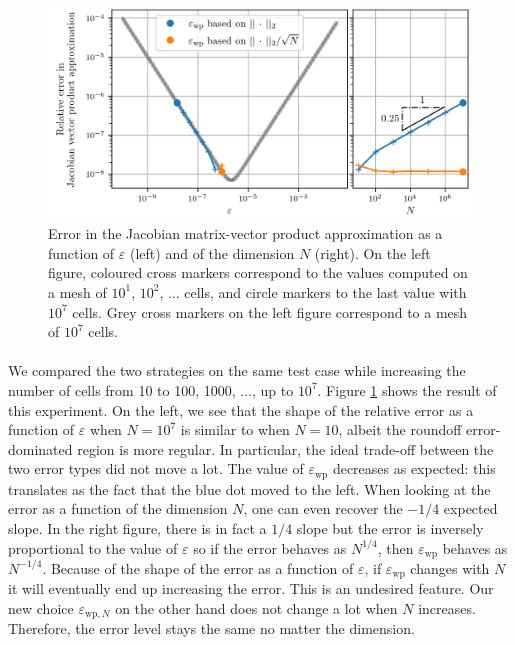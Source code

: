       \begin{figure}
        \centering
        \includegraphics[width=\textwidth]{figures/epsilon_Burgers.png}
        \caption{
          Error in the Jacobian matrix-vector product approximation as a function of $\varepsilon$ (left) and of the dimension $N$ (right).
          On the left figure, coloured cross markers correspond to the values computed on a mesh of $10^1$, $10^2$, ... cells, and circle markers to the last value with $10^7$ cells.
          Grey cross markers on the left figure correspond to a mesh of $10^7$ cells.
        }
        \label{fig:epsilon_burgers}
      \end{figure}

      \paragraph{}
      We compared the two strategies on the same test case while increasing the number of cells from 10 to 100, 1000, ..., up to $10^7$.
      Figure \ref{fig:epsilon_burgers} shows the result of this experiment.
      On the left, we see that the shape of the relative error as a function of $\varepsilon$ when $N = 10^7$ is similar to when $N = 10$, albeit the roundoff error-dominated region is more regular.
      In particular, the ideal trade-off between the two error types did not move a lot.
      The value of $\varepsilon_\textrm{wp}$ decreases as expected: this translates as the fact that the blue dot moved to the left.
      When looking at the error as a function of the dimension $N$, one can even recover the $-1/4$ expected slope.
      In the right figure, there is in fact a $1/4$ slope but the error is inversely proportional to the value of $\varepsilon$ so if the error behaves as $N^{1/4}$, then $\varepsilon_\textrm{wp}$ behaves as $N^{-1/4}$.
      Because of the shape of the error as a function of $\varepsilon$, if $\varepsilon_\textrm{wp}$ changes with $N$ it will eventually end up increasing the error.
      This is an undesired feature.
      Our new choice $\varepsilon_{\textrm{wp}, N}$ on the other hand does not change a lot when $N$ increases.
      Therefore, the error level stays the same no matter the dimension.

